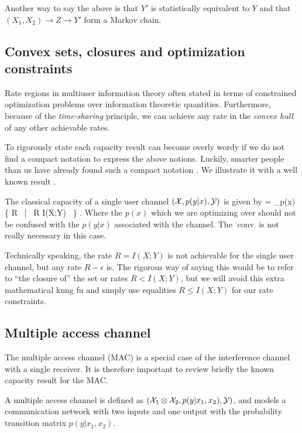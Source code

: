\documentclass[aps,11pt,twoside,letterpaper]{article}
\begin{document}
        Another way to say the above is that $Y'$ is statistically equivalent to $Y$ and
        that $(X_1,X_2) \to Z \to Y' $ form a Markov chain.
        

    \subsection{Convex sets, closures and optimization constraints}
    	
	Rate regions in multiuser information theory often stated in terms of constrained 
	optimization problems over information theoretic quantities.
	Furthermore, because of the \emph{time-sharing} principle, 
	we can achieve any rate in the \emph{convex hull} of any other achievable rates.
	
	To rigorously state each capacity result can become overly wordy if we do not
	find a compact notation to express the above notions.
	Luckily, smarter people than us have already found such a compact notation \cite{Sato77}.
	We illustrate it with a well known result \cite{S48}.
	
	The classical capacity of a single user channel $({\cal X},p(y|x),{\cal Y})$ is given by
	\be
		 =  \bigcup_{p(x)} \{ R  \ | \ R \leq I(X;Y) \  \} .
	\ee
	Where the $p(x)$ which we are optimizing over should not be confused with 
	the $p(y|x)$ associated with the channel.
	The $\operatorname{conv}$ is not really necessary in this case.
	
	Technically speaking, the rate $R = I(X;Y)$ is not achievable for the single user channel,
	but any rate $R-\epsilon$ is.
	The rigorous way of saying this would be to refer to ``the closure of'' the set or rates 
	$R < I(X;Y)$, but we will avoid this extra mathematical  kung fu and simply use equalities 
	$R \leq I(X;Y)$ for our rate constraints.


    \subsection{Multiple access channel} \label{subseciton:MAC}

        The multiple access channel (MAC) is a special case of the interference channel with a single 
        receiver. 
        It is therefore important to review briefly the known capacity result for the MAC.

        \begin{definition}[MAC]
            A multiple access channel is defined as $({\cal X}_1 \otimes {\cal X}_2, p(y|x_1,x_2), {\cal Y})$,
            and models a communication network with two inputs and one output with 
            the probability transition matrix $p(y|x_1,x_2)$.
        \end{definition}
        
\end{document}
